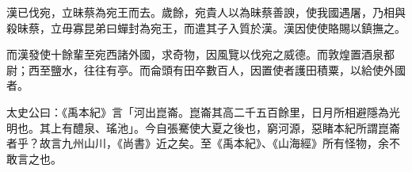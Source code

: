 \begin{pinyinscope}
漢已伐宛，立昧蔡為宛王而去。歲餘，宛貴人以為昧蔡善諛，使我國遇屠，乃相與殺昧蔡，立毋寡昆弟曰蟬封為宛王，而遣其子入質於漢。漢因使使賂賜以鎮撫之。

而漢發使十餘輩至宛西諸外國，求奇物，因風覽以伐宛之威德。而敦煌置酒泉都尉；西至鹽水，往往有亭。而侖頭有田卒數百人，因置使者護田積粟，以給使外國者。

太史公曰：《禹本紀》言「河出崑崙。崑崙其高二千五百餘里，日月所相避隱為光明也。其上有醴泉、瑤池」。今自張騫使大夏之後也，窮河源，惡睹本紀所謂崑崙者乎？故言九州山川，《尚書》近之矣。至《禹本紀》、《山海經》所有怪物，余不敢言之也。


\end{pinyinscope}
